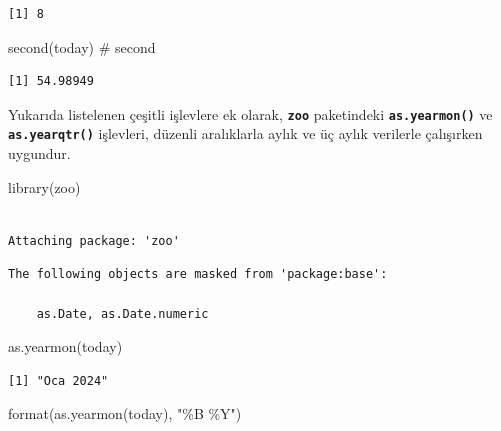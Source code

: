\documentclass[
  letterpaper,
  DIV=11,
  numbers=noendperiod]{scrreprt}
\newenvironment{Shaded}{\begin{snugshade}}{\end{snugshade}}
\newcommand{\CommentTok}[1]{\textcolor[rgb]{0.37,0.37,0.37}{#1}}
\newcommand{\FunctionTok}[1]{\textcolor[rgb]{0.28,0.35,0.67}{#1}}
\newcommand{\NormalTok}[1]{\textcolor[rgb]{0.00,0.23,0.31}{#1}}
\newcommand{\StringTok}[1]{\textcolor[rgb]{0.13,0.47,0.30}{#1}}
\begin{document}
\begin{verbatim}
[1] 8
\end{verbatim}

\begin{Shaded}
\begin{Highlighting}[]
\FunctionTok{second}\NormalTok{(today) }\CommentTok{\# second}
\end{Highlighting}
\end{Shaded}

\begin{verbatim}
[1] 54.98949
\end{verbatim}

Yukarıda listelenen çeşitli işlevlere ek olarak, \textbf{\texttt{zoo}}
paketindeki \textbf{\texttt{as.yearmon()}} ve
\textbf{\texttt{as.yearqtr()}} işlevleri, düzenli aralıklarla aylık ve
üç aylık verilerle çalışırken uygundur.

\begin{Shaded}
\begin{Highlighting}[]
\FunctionTok{library}\NormalTok{(zoo)}
\end{Highlighting}
\end{Shaded}

\begin{verbatim}

Attaching package: 'zoo'
\end{verbatim}

\begin{verbatim}
The following objects are masked from 'package:base':

    as.Date, as.Date.numeric
\end{verbatim}

\begin{Shaded}
\begin{Highlighting}[]
\FunctionTok{as.yearmon}\NormalTok{(today)}
\end{Highlighting}
\end{Shaded}

\begin{verbatim}
[1] "Oca 2024"
\end{verbatim}

\begin{Shaded}
\begin{Highlighting}[]
\FunctionTok{format}\NormalTok{(}\FunctionTok{as.yearmon}\NormalTok{(today), }\StringTok{"\%B \%Y"}\NormalTok{)}
\end{Highlighting}
\end{Shaded}
\end{document}

